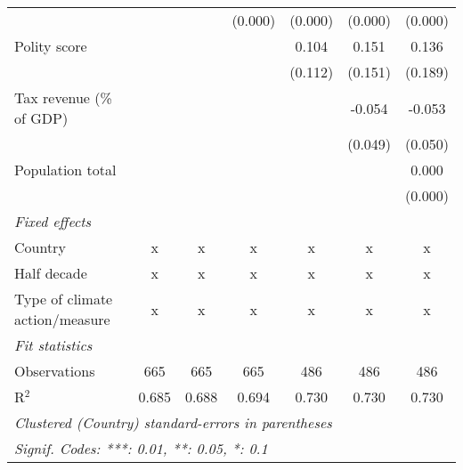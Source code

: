 \begin{tabular}{lcccccc}
                                                                                        &              &               & (0.000)        & (0.000)        & (0.000)        & (0.000)\\   
   Polity score                                                                         &              &               &                & 0.104          & 0.151          & 0.136\\   
                                                                                        &              &               &                & (0.112)        & (0.151)        & (0.189)\\   
   Tax revenue (\% of GDP)                                                              &              &               &                &                & -0.054         & -0.053\\   
                                                                                        &              &               &                &                & (0.049)        & (0.050)\\   
   Population total                                                                     &              &               &                &                &                & 0.000\\   
                                                                                        &              &               &                &                &                & (0.000)\\   
   \emph{Fixed effects}\\
   Country                                                                              & x            & x             & x              & x              & x              & x\\  
   Half decade                                                                          & x            & x             & x              & x              & x              & x\\  
   Type of climate action/measure                                                       & x            & x             & x              & x              & x              & x\\  
   \midrule \emph{Fit statistics}\\
   Observations                                                                         & 665          & 665           & 665            & 486            & 486            & 486\\  
   R$^2$                                                                                & 0.685        & 0.688         & 0.694          & 0.730          & 0.730          & 0.730\\  
   \midrule
   \multicolumn{7}{l}{\emph{Clustered (Country) standard-errors in parentheses}}\\
   \multicolumn{7}{l}{\emph{Signif. Codes: ***: 0.01, **: 0.05, *: 0.1}}\\
\end{tabular}
\par\endgroup


